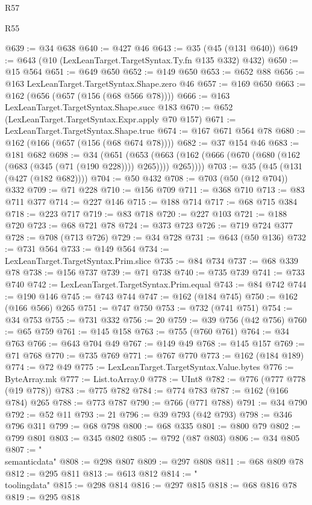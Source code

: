 \begin{lexlean}{R57}
\begin{lexlean}{R55}
\begin{coremodule}
{{{{{{{{{{{{{{{{{{{{{{{{{{{{{{{{{{{{{{{{{{{{{{{{{{{{{{{{{{{{{{@639 := @34 @638
@640 := @427 @46
@643 := @35 (@45 (@131 @640))
@649 := @643 (@10 (LexLeanTarget.TargetSyntax.Ty.fn @135 @332) @432)
@650 := @15 @564
@651 := @649 @650
@652 := @149 @650
@653 := @652 @88
@656 := @163 LexLeanTarget.TargetSyntax.Shape.zero @46
@657 := @169 @650
@663 := @162 (@656 (@657 (@156 (@68 @566 @78))))
@666 := @163 LexLeanTarget.TargetSyntax.Shape.succ @183
@670 := @652 (LexLeanTarget.TargetSyntax.Expr.apply @70 @157)
@671 := LexLeanTarget.TargetSyntax.Shape.true
@674 := @167 @671 @564 @78
@680 := @162 (@166 (@657 (@156 (@68 @674 @78))))
@682 := @37 @154 @46
@683 := @181 @682
@698 := @34
    (@651
      (@653 (@663 (@162 (@666 (@670 (@680 (@162 (@683 (@345 (@71 (@190 @228)))) @265)))) @265))))
@703 := @35 (@45 (@131 (@427 (@182 @682))))
@704 := @50 @432
@708 := @703 (@50 (@12 @704)) @332
@709 := @71 @228
@710 := @156 @709
@711 := @368 @710
@713 := @83 @711 @377
@714 := @227 @146
@715 := @188 @714
@717 := @68 @715 @384
@718 := @223 @717
@719 := @83 @718
@720 := @227 @103
@721 := @188 @720
@723 := @68 @721 @78
@724 := @373 @723
@726 := @719 @724 @377
@728 := @708 (@713 @726)
@729 := @34 @728
@731 := @643 (@50 @136)
@732 := @731 @564
@733 := @149 @564
@734 := LexLeanTarget.TargetSyntax.Prim.slice
@735 := @84 @734
@737 := @68 @339 @78
@738 := @156 @737
@739 := @71 @738
@740 := @735 @739
@741 := @733 @740
@742 := LexLeanTarget.TargetSyntax.Prim.equal
@743 := @84 @742
@744 := @190 @146
@745 := @743 @744
@747 := @162 (@184 @745)
@750 := @162 (@166 @566) @265
@751 := @747 @750
@753 := @732 (@741 @751)
@754 := @34 @753
@755 := @731 @332
@756 := 20
@759 := @39 @756 (@42 @756)
@760 := @65 @759
@761 := @145 @158
@763 := @755 (@760 @761)
@764 := @34 @763
@766 := @643 @704 @49
@767 := @149 @49
@768 := @145 @157
@769 := @71 @768
@770 := @735 @769
@771 := @767 @770
@773 := @162 (@184 @189)
@774 := @72 @49
@775 := LexLeanTarget.TargetSyntax.Value.bytes
@776 := ByteArray.mk
@777 := List.toArray.{0}
@778 := UInt8
@782 := @776 (@777 @778 (@19 @778))
@783 := @775 @782
@784 := @774 @783
@787 := @162 (@166 @784) @265
@788 := @773 @787
@790 := @766 (@771 @788)
@791 := @34 @790
@792 := @52 @11
@793 := 21
@796 := @39 @793 (@42 @793)
@798 := @346 @796 @311
@799 := @68 @798
@800 := @68 @335
@801 := @800 @79
@802 := @799 @801
@803 := @345 @802
@805 := @792 (@87 @803)
@806 := @34 @805
@807 := "\\semanticdata"
@808 := @298 @807
@809 := @297 @808
@811 := @68 @809 @78
@812 := @295 @811
@813 := @613 @812
@814 := "\\toolingdata"
@815 := @298 @814
@816 := @297 @815
@818 := @68 @816 @78
@819 := @295 @818
}}}}}}}}}}}}}}}}}}}}}}}}}}}}}}}}}}}}}}}}}}}}}}}}}}}}}}}}}}}}}}
\end{coremodule}
\end{lexlean}
\end{lexlean}
